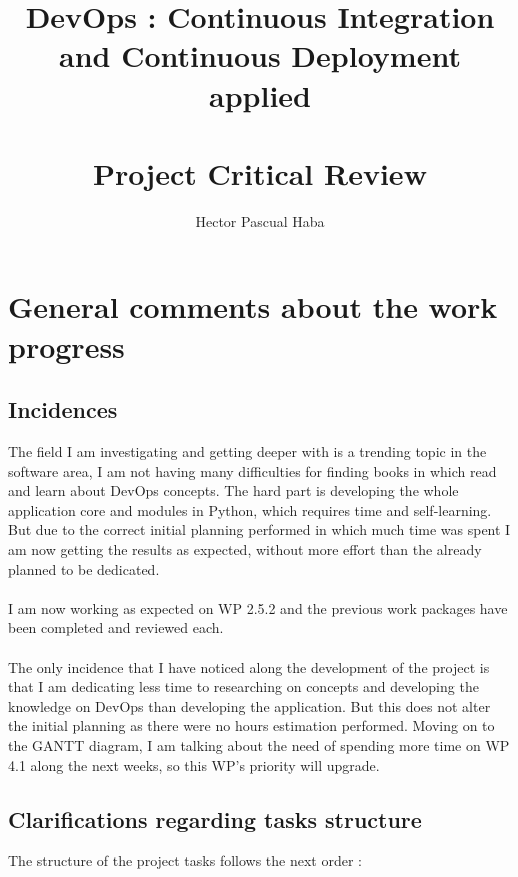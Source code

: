 \documentclass[a4paper]{article}
\title{\textbf{DevOps : Continuous Integration and Continuous Deployment applied} \\~\\
\large \textbf{Project Critical Review}}
\author{Hector Pascual Haba}
\begin{document}
\maketitle 

\section{General comments about the work progress}

\subsection{Incidences}

The field I am investigating and getting deeper with is a trending topic in the software area, I am not having many difficulties for finding books in which read and learn about DevOps concepts. The hard part is developing the whole application core and modules in Python, which requires time and self-learning. But due to the correct initial planning performed in which much time was spent I am now getting the results as expected, without more effort than the already planned to be dedicated.
\\~\\
I am now working as expected on WP 2.5.2 and the previous work packages have been completed and reviewed each.
\\~\\
The only incidence that I have noticed along the development of the project is that I am dedicating less time to researching on concepts and developing the knowledge on DevOps than developing the application. But this does not alter the initial planning as there were no hours estimation performed. Moving on to the GANTT diagram, I am talking about the need of spending more time on WP 4.1 along the next weeks, so this WP's priority will upgrade.

\subsection{Clarifications regarding tasks structure}

The structure of the project tasks follows the next order :
\end{document}
